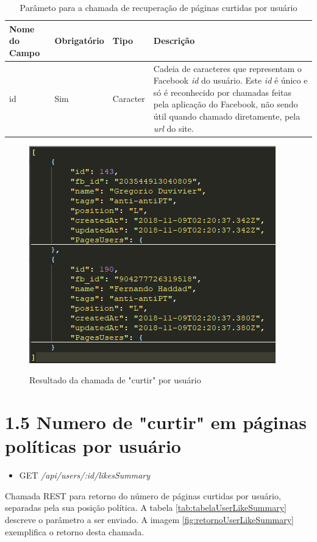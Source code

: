 \documentclass[
	12pt,				%
	oneside,			%
	a4paper,			%
	english,			%
	brazil				%
	]{abntex2ppgsi}
\begin{document}
\begin{apendicesenv}
 \begin{table}[htbp]
	\centering
	\caption{Parâmeto para a chamada de recuperação de páginas curtidas por usuário}
	\begin{tabular}{p{1.5in} p{1in} p{1in} p{1.5in}  } \hline
		Nome do Campo 		& 		Obrigatório 		& 		Tipo 		&		 Descrição \\ \hline
		id				& 		Sim					& Caracter 		&
		Cadeia de caracteres que representam o Facebook \textit{id} do usuário. Este \textit{id} é único e só é reconhecido por chamadas feitas pela aplicação do Facebook, não sendo útil quando chamado diretamente, pela \textit{url} do site.
	\end{tabular}
	\label{tab:tabelaUserLike}
\end{table}

\begin{figure}[H]
	\centering
	\caption{Resultado da chamada de "curtir" por usuário}
	\includegraphics[scale=1]{resultadoUserLike.png}
	\label{fig:retornoUserLike}
\end{figure}

\section*{1.5 Numero de "curtir" em páginas políticas por usuário}

\begin{itemize}
	\item {GET} \textit{/api/users/:id/likesSummary}
\end{itemize}

Chamada REST para retorno do número de páginas curtidas por usuário, separadas pela sua posição política.  A tabela \ref{tab:tabelaUserLikeSummary} descreve o parâmetro a ser enviado. A imagem \ref{fig:retornoUserLikeSummary} exemplifica o retorno desta chamada.


\end{apendicesenv}
\end{document}
